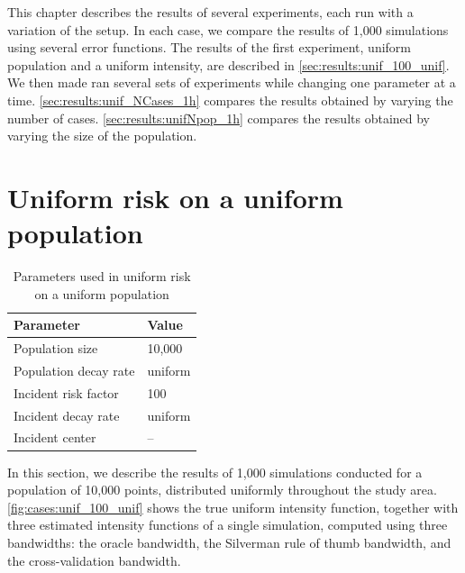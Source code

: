 

This chapter describes the results of several experiments, each run with a variation of the setup.
In each case, we compare the results of 1,000 simulations using several error functions.
The results of the first experiment, uniform population and a uniform intensity,
are described in \autoref{sec:results:unif_100_unif}.
We then made ran several sets of experiments while changing one parameter at a time.
\autoref{sec:results:unif_NCases_1h} compares the results obtained by varying the number of cases.
\autoref{sec:results:unifNpop_1h} compares the results obtained by varying the size of the population.


\section{Uniform risk on a uniform population}
\label{sec:results:unif_100_unif}

\begin{table}[htbp]
\centering
\begin{tabular}{ll}
\hline
Parameter & Value \\
\hline
Population size & 10,000 \\
Population decay rate & uniform \\
Incident risk factor & 100 \\
Incident decay rate & uniform \\
Incident center & -- \\
\hline
\end{tabular}
\caption{Parameters used in uniform risk on a uniform population}
\label{tbl:params:unif_100_unif}
\end{table}

In this section, we describe the results of 1,000 simulations conducted for a population of 10,000 points,
distributed uniformly throughout the study area.
\autoref{fig:cases:unif_100_unif} shows the true uniform intensity function,
together with three estimated intensity functions of a single simulation,
computed using three bandwidths: the oracle bandwidth, the Silverman rule of thumb bandwidth,
and the cross-validation bandwidth.

